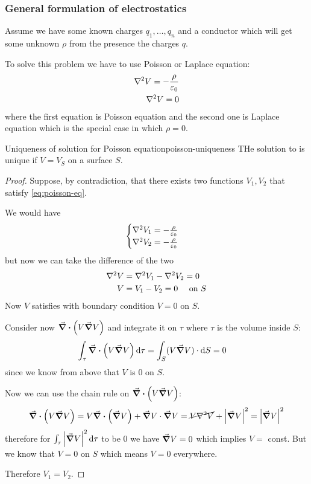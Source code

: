 \documentclass[12pt]{extarticle}
\begin{document}
\subsubsection{General formulation of electrostatics}

Assume we have some known charges $q_1, \dots, q_n$ and a conductor which will get some unknown $\rho$ from the presence the charges $q$.

To solve this problem we have to use Poisson or Laplace equation:
\begin{align}
    \laplacian V = -\frac{\rho}{\varepsilon_0} \label{eq:poisson-eq} \\
    \laplacian V = 0 \label{eq:laplace-eq}
\end{align}
where the first equation is Poisson equation and the second one is Laplace equation which is the special case in which $\rho = 0$.

\begin{theorem}{Uniqueness of solution for Poisson equation}{poisson-uniqueness}
    THe solution to  is unique if $V = V_S$ on a surface $S$.
\end{theorem}

\begin{proof}
    Suppose, by contradiction, that there exists two functions $V_1, V_2$ that satisfy \cref{eq:poisson-eq}.

    We would have
    \begin{equation}
        \begin{cases}
            \laplacian V_1 = - \frac{\rho}{\varepsilon_0} \\
            \laplacian V_2 = - \frac{\rho}{\varepsilon_0} \\
        \end{cases}
    \end{equation}
    but now we can take the difference of the two
    \begin{align}
        \laplacian V & = \laplacian V_1 - \laplacian V_2 = 0 \\
        V            & = V_1 - V_2 = 0 \quad \text{ on }S
    \end{align}
    Now $V$ satisfies  with boundary condition $V = 0$ on $S$.

    Consider now $\div (V \grad V)$ and integrate it on $\tau$ where $\tau$ is the volume inside $S$:
    \begin{align}
        \int_\tau \div (V \grad V) \dd{\tau} & = \int_S (V \grad V) \cdot \dd{S} = 0
    \end{align}
    since we know from above that $V$ is $0$ on $S$.

    Now we can use the chain rule on $\div (V \grad V)$:
    \begin{equation}
        \div (V \grad V) = V \div (\grad V) + \grad V \cdot \grad V = \cancel{V \laplacian V} + \abs{\grad V}^2 = \abs{\grad V}^2
    \end{equation}
    therefore for $\int_\tau \abs{\grad V}^2 \dd{\tau}$ to be $0$ we have $\grad V = 0$ which implies $V = $ const.
    But we know that $V = 0$ on $S$ which means $V = 0$ everywhere.

    Therefore $V_1 = V_2$.
\end{proof}
\end{document}
